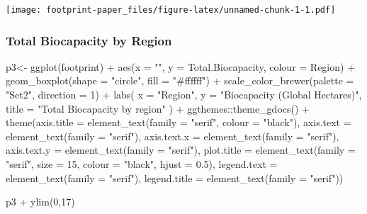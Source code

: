 \documentclass[
]{article}
\newenvironment{Shaded}{\begin{snugshade}}{\end{snugshade}}
\newcommand{\AttributeTok}[1]{\textcolor[rgb]{0.77,0.63,0.00}{#1}}
\newcommand{\DecValTok}[1]{\textcolor[rgb]{0.00,0.00,0.81}{#1}}
\newcommand{\FloatTok}[1]{\textcolor[rgb]{0.00,0.00,0.81}{#1}}
\newcommand{\FunctionTok}[1]{\textcolor[rgb]{0.00,0.00,0.00}{#1}}
\newcommand{\NormalTok}[1]{#1}
\newcommand{\OtherTok}[1]{\textcolor[rgb]{0.56,0.35,0.01}{#1}}
\newcommand{\SpecialCharTok}[1]{\textcolor[rgb]{0.00,0.00,0.00}{#1}}
\newcommand{\StringTok}[1]{\textcolor[rgb]{0.31,0.60,0.02}{#1}}
\begin{document}
\texttt{[image: footprint-paper\_files/figure-latex/unnamed-chunk-1-1.pdf]}

\hypertarget{total-biocapacity-by-region}{%
\subsubsection{Total Biocapacity by
Region}\label{total-biocapacity-by-region}}

\begin{Shaded}
\begin{Highlighting}[]
\NormalTok{p3}\OtherTok{\textless{}{-}} \FunctionTok{ggplot}\NormalTok{(footprint) }\SpecialCharTok{+}
  \FunctionTok{aes}\NormalTok{(}\AttributeTok{x =} \StringTok{""}\NormalTok{, }\AttributeTok{y =}\NormalTok{ Total.Biocapacity, }\AttributeTok{colour =}\NormalTok{ Region) }\SpecialCharTok{+}
  \FunctionTok{geom\_boxplot}\NormalTok{(}\AttributeTok{shape =} \StringTok{"circle"}\NormalTok{, }\AttributeTok{fill =} \StringTok{"\#ffffff"}\NormalTok{) }\SpecialCharTok{+}
  \FunctionTok{scale\_color\_brewer}\NormalTok{(}\AttributeTok{palette =} \StringTok{"Set2"}\NormalTok{, }\AttributeTok{direction =} \DecValTok{1}\NormalTok{) }\SpecialCharTok{+}
  \FunctionTok{labs}\NormalTok{(}
    \AttributeTok{x =} \StringTok{"Region"}\NormalTok{,}
    \AttributeTok{y =} \StringTok{"Biocapacity (Global Hectares)"}\NormalTok{,}
    \AttributeTok{title =} \StringTok{"Total Biocapacity by region"}
\NormalTok{  ) }\SpecialCharTok{+}
\NormalTok{  ggthemes}\SpecialCharTok{::}\FunctionTok{theme\_gdocs}\NormalTok{() }\SpecialCharTok{+} \FunctionTok{theme}\NormalTok{(}\AttributeTok{axis.title =} \FunctionTok{element\_text}\NormalTok{(}\AttributeTok{family =} \StringTok{"serif"}\NormalTok{,}
    \AttributeTok{colour =} \StringTok{"black"}\NormalTok{), }\AttributeTok{axis.text =} \FunctionTok{element\_text}\NormalTok{(}\AttributeTok{family =} \StringTok{"serif"}\NormalTok{),}
    \AttributeTok{axis.text.x =} \FunctionTok{element\_text}\NormalTok{(}\AttributeTok{family =} \StringTok{"serif"}\NormalTok{),}
    \AttributeTok{axis.text.y =} \FunctionTok{element\_text}\NormalTok{(}\AttributeTok{family =} \StringTok{"serif"}\NormalTok{),}
    \AttributeTok{plot.title =} \FunctionTok{element\_text}\NormalTok{(}\AttributeTok{family =} \StringTok{"serif"}\NormalTok{,}
        \AttributeTok{size =} \DecValTok{15}\NormalTok{, }\AttributeTok{colour =} \StringTok{"black"}\NormalTok{, }\AttributeTok{hjust =} \FloatTok{0.5}\NormalTok{),}
    \AttributeTok{legend.text =} \FunctionTok{element\_text}\NormalTok{(}\AttributeTok{family =} \StringTok{"serif"}\NormalTok{),}
    \AttributeTok{legend.title =} \FunctionTok{element\_text}\NormalTok{(}\AttributeTok{family =} \StringTok{"serif"}\NormalTok{))}

\NormalTok{p3 }\SpecialCharTok{+} \FunctionTok{ylim}\NormalTok{(}\DecValTok{0}\NormalTok{,}\DecValTok{17}\NormalTok{)}
\end{Highlighting}
\end{Shaded}
\end{document}
